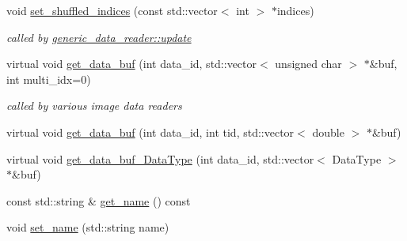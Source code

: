 \begin{DoxyCompactItemize}
void \hyperlink{classlbann_1_1generic__data__store_abdf41bf60ba37fa3de49c65c178dc7b0}{set\+\_\+shuffled\+\_\+indices} (const std\+::vector$<$ int $>$ $\ast$indices)
\begin{DoxyCompactList}\small\item\em called by \hyperlink{classlbann_1_1generic__data__reader_a1d10dec5713fbe60e61b4dc400227ade}{generic\+\_\+data\+\_\+reader\+::update} \end{DoxyCompactList}\item 
virtual void \hyperlink{classlbann_1_1generic__data__store_a2abb3d0327b528d36e23fcef9b937798}{get\+\_\+data\+\_\+buf} (int data\+\_\+id, std\+::vector$<$ unsigned char $>$ $\ast$\&buf, int multi\+\_\+idx=0)
\begin{DoxyCompactList}\small\item\em called by various image data readers \end{DoxyCompactList}\item 
virtual void \hyperlink{classlbann_1_1generic__data__store_abc3fecd958650a74e76070ea4f394bea}{get\+\_\+data\+\_\+buf} (int data\+\_\+id, int tid, std\+::vector$<$ double $>$ $\ast$\&buf)
\item 
virtual void \hyperlink{classlbann_1_1generic__data__store_ab3f8b7fe6d6631059d92714d4277a983}{get\+\_\+data\+\_\+buf\+\_\+\+Data\+Type} (int data\+\_\+id, std\+::vector$<$ Data\+Type $>$ $\ast$\&buf)
\item 
const std\+::string \& \hyperlink{classlbann_1_1generic__data__store_a53140adb8f7c2348986916a1abb85ffa}{get\+\_\+name} () const
\item 
void \hyperlink{classlbann_1_1generic__data__store_a853741295a07b5687921fc56d0d7d5b2}{set\+\_\+name} (std\+::string name)
\end{DoxyCompactItemize}
